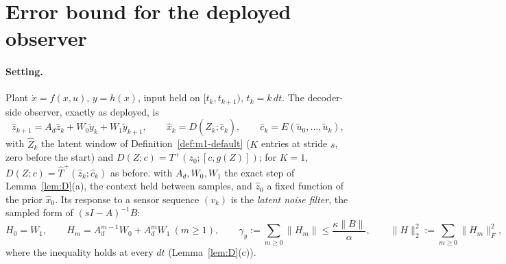 
\section{Error bound for the deployed observer}\label{sec:m3}

\paragraph{Setting.} Plant $\dot x=f(x,u)$, $y=h(x)$, input held on $[t_k,t_{k+1})$, $t_k=k\,dt$.
The decoder-side observer, exactly as deployed, is
\begin{equation}\label{eq:m3-obs}
\hat z_{k+1}=A_d\hat z_k+W_0\tilde y_k+W_1\tilde y_{k+1},\qquad
\hat x_k=D(\hat Z_k;\hat c_k),\qquad \hat c_k=E(\tilde u_0,\dots,\tilde u_k),
\end{equation}
 with $\hat Z_k$ the latent window of Definition~\ref{def:m1-default} ($K$ entries at stride
$s$, zero before the start) and $D(Z;c)=T^+(z_0;[c,g(Z)])$; for $K=1$, $D(Z;c)=\hat T^+(\hat z_k;\hat c_k)$ as before.
with $A_d,W_0,W_1$ the exact step of Lemma~\ref{lem:D}(a), the context held between samples, and
$\hat z_0$ a fixed function of the prior $\hat x_0$. Its response to a sensor sequence $(v_k)$ is
the \emph{latent noise filter}, the sampled form of $(sI-A)^{-1}B$:
\begin{equation}\label{eq:m3-H}
H_0=W_1,\qquad H_m=A_d^{m-1}W_0+A_d^{m}W_1\ (m\ge1),\qquad
\gamma_y:=\sum_{m\ge0}\|H_m\|\le\frac{\kappa\|B\|}{\alpha},\qquad \|H\|_2^2:=\sum_{m\ge0}\|H_m\|_F^2 ,
\end{equation}
where the inequality holds at every $dt$ (Lemma~\ref{lem:D}(c)).

